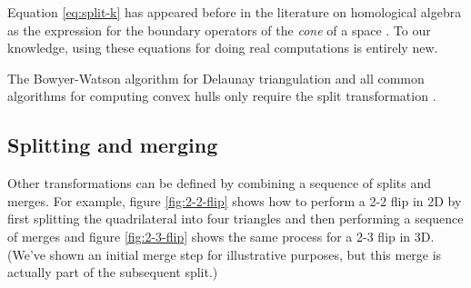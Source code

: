 \documentclass[twocolumn]{article}
\begin{document}
Equation \eqref{eq:split-k} has appeared before in the literature on homological algebra as the expression for the boundary operators of the \emph{cone} of a space \cite{gelfand1994homological}.
To our knowledge, using these equations for doing real computations is entirely new.

The Bowyer-Watson algorithm for Delaunay triangulation and all common algorithms for computing convex hulls only require the split transformation \cite{berg1997computational}.

\subsection{Splitting and merging}

Other transformations can be defined by combining a sequence of splits and merges.
For example, figure \ref{fig:2-2-flip} shows how to perform a 2-2 flip in 2D by first splitting the quadrilateral into four triangles and then performing a sequence of merges and figure \ref{fig:2-3-flip} shows the same process for a 2-3 flip in 3D.
(We've shown an initial merge step for illustrative purposes, but this merge is actually part of the subsequent split.)
\end{document}
